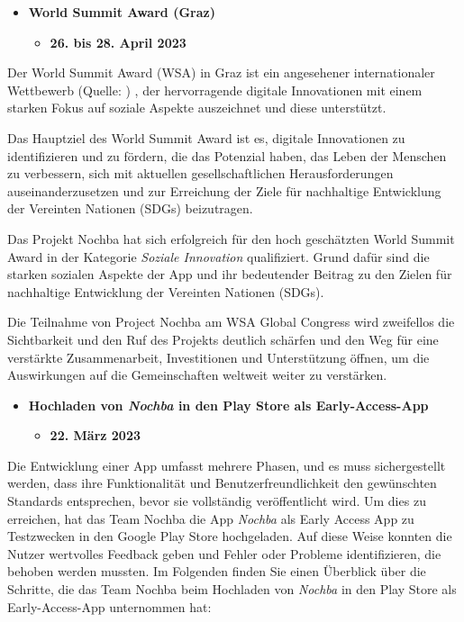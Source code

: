 \begin{itemize}
    \item \textbf{World Summit Award (Graz)}
          \begin{itemize}
              \item \textbf{26. bis 28. April 2023}
          \end{itemize}
\end{itemize}

Der World Summit Award (WSA) in Graz ist ein angesehener internationaler Wettbewerb (Quelle: \cite{wsa-global} ) , der hervorragende digitale Innovationen mit einem starken Fokus auf soziale Aspekte auszeichnet und diese unterstützt. 

Das Hauptziel des World Summit Award ist es, digitale Innovationen zu identifizieren und zu fördern, die das Potenzial haben, das Leben der Menschen zu verbessern, sich mit aktuellen gesellschaftlichen Herausforderungen auseinanderzusetzen und zur Erreichung der Ziele für nachhaltige Entwicklung der Vereinten Nationen (SDGs) beizutragen. 

Das Projekt Nochba hat sich erfolgreich für den hoch geschätzten World Summit Award in der Kategorie \textit{Soziale Innovation} qualifiziert. Grund dafür sind die starken sozialen Aspekte der App und ihr bedeutender Beitrag zu den Zielen für nachhaltige Entwicklung der Vereinten Nationen (SDGs).

Die Teilnahme von Project Nochba am WSA Global Congress wird zweifellos die Sichtbarkeit und den Ruf des Projekts deutlich schärfen und den Weg für eine verstärkte Zusammenarbeit, Investitionen und Unterstützung öffnen, um die Auswirkungen auf die Gemeinschaften weltweit weiter zu verstärken. 

\begin{itemize}
    \item \textbf{Hochladen von \textit{Nochba} in den Play Store als Early-Access-App}
          \begin{itemize}
              \item \textbf{22. März 2023}
          \end{itemize}
\end{itemize}

Die Entwicklung einer App umfasst mehrere Phasen, und es muss sichergestellt werden, dass ihre Funktionalität und Benutzerfreundlichkeit den gewünschten Standards entsprechen, bevor sie vollständig veröffentlicht wird. Um dies zu erreichen, hat das Team Nochba die App \textit{Nochba} als Early Access App zu Testzwecken in den Google Play Store hochgeladen. Auf diese Weise konnten die Nutzer wertvolles Feedback geben und Fehler oder Probleme identifizieren, die behoben werden mussten. Im Folgenden finden Sie einen Überblick über die Schritte, die das Team Nochba beim Hochladen von \textit{Nochba} in den Play Store als Early-Access-App unternommen hat:

